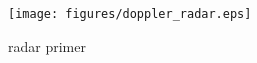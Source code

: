 \begin{figure}[h]
\texttt{[image: figures/doppler\_radar.eps]}
\caption{radar primer}
\label{fig:radar primer}
\end{figure}

